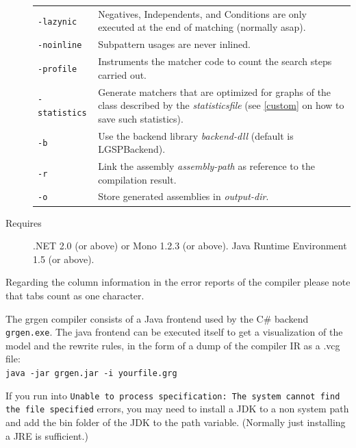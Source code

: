 \begin{description}
\begin{tabularx}{\linewidth}{lX}
      \texttt{-lazynic} & Negatives, Independents, and Conditions are only executed at the end of matching (normally asap).\\
      \texttt{-noinline} & Subpattern usages are never inlined.\\
      \texttt{-profile} & Instruments the matcher code to count the search steps carried out.\\
      \texttt{-statistics} & Generate matchers that are optimized for graphs of the class described by the \emph{statisticsfile} (see \ref{custom} on how to save such statistics).\\
      \texttt{-b} & Use the backend library \emph{backend-dll} (default is LGSPBackend).\\
      \texttt{-r} & Link the assembly \emph{assembly-path} as reference to the compilation result.\\
      \texttt{-o} & Store generated assemblies in \emph{output-dir}.
    \end{tabularx}
  \item[Requires] .NET 2.0 (or above) or Mono 1.2.3 (or above). Java Runtime Environment 1.5 (or above).
\end{description}

\begin{note}
Regarding the column information in the error reports of the compiler please note that tabs count as one character.
\end{note}

\begin{note}\label{note:modelruledump}
The grgen compiler consists of a Java frontend used by the C\# backend \texttt{grgen.exe}.
The java frontend can be executed itself to get a visualization of the model and the rewrite rules,
in the form of a dump of the compiler IR as a .vcg file:\\
\texttt{java -jar grgen.jar -i yourfile.grg}
\end{note}

\begin{note}
If you run into \texttt{Unable to process specification: The system cannot find the file specified} errors, 
you may need to install a JDK to a non system path and add the bin folder of the JDK to the path variable.
(Normally just installing a JRE is sufficient.)
\end{note}


